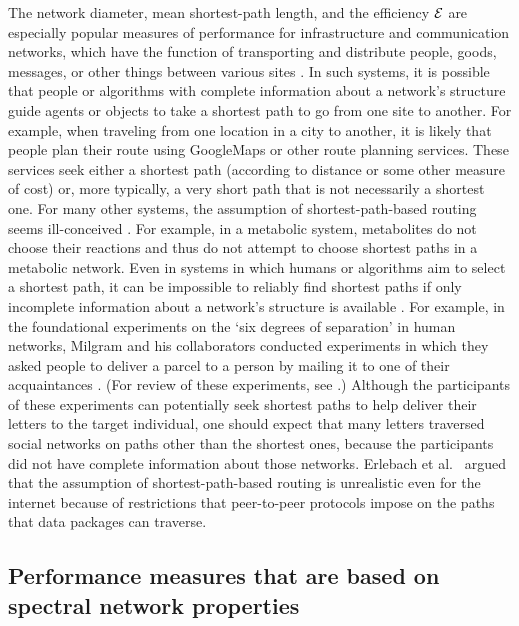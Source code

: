 \documentclass{comnet-mod}
\begin{document}
The network diameter, mean shortest-path length, and the efficiency $\mathcal{E}$ are especially popular measures of performance for infrastructure and communication networks, which have the function of transporting and distribute people, goods, messages, or other things between various sites \cite{Cardenas2010, Nair2011, Hossain2013, Zhang2013, Lordan2014, LaRocca2015, Ren2016, Colladon2017}. In such systems, it is possible that people or algorithms with complete information about a network's structure guide agents or objects to take a shortest path to go from one site to another. For example, when traveling from one location in a city to another, it is likely that people plan their route using GoogleMaps or other route planning services. These services seek either a shortest path (according to distance or some other measure of cost) or, more typically, a very short path that is not necessarily a shortest one. For many other systems, the assumption of shortest-path-based routing seems ill-conceived \cite{Lee2012}. For example, in a metabolic system, metabolites do not choose their reactions and thus do not attempt to choose shortest paths in a metabolic network. Even in systems in which humans or algorithms aim to select a shortest path, it can be impossible to reliably find shortest paths if only incomplete information about a network's structure is available \cite{Kleinberg2000}. For example, in the foundational experiments on the `six degrees of separation' in human networks, Milgram and his collaborators conducted experiments in which they asked people to deliver a parcel to a person by mailing it to one of their acquaintances \cite{Milgram1967, Milgram1969}. (For review of these experiments, see \cite{Newman2018, Baek2021}.) Although the participants of these experiments can potentially seek shortest paths to help deliver their letters to the target individual, one should expect that many letters traversed social networks on paths other than the shortest ones, because the participants did not have complete information about those networks. Erlebach et al.~\cite{Erlebach2006} argued that the assumption of shortest-path-based routing is unrealistic even for the internet because of restrictions that peer-to-peer protocols impose on the paths that data packages can traverse.


\subsection{Performance measures that are based on spectral network properties}\label{sec:review:spectral}
\end{document}
